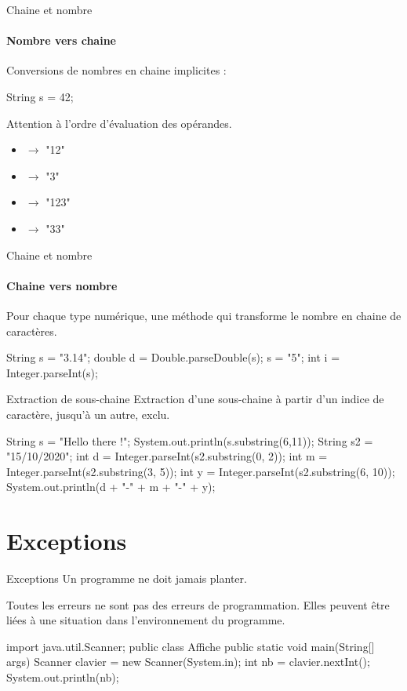 \begin{frame}[fragile]{Chaine et nombre}
  \framesubtitle{Nombre vers chaine}
  Conversions de nombres en chaine implicites :
  \begin{java}
String s = 42;
  \end{java}

  \pause Attention à l'ordre d'évaluation des opérandes.
  \begin{itemize}
    \item {} \pause \(\rightarrow\) "12"
    \pause
    \item {} \pause \(\rightarrow\) "3"
    \pause
    \item {} \pause\(\rightarrow\) "123"
    \pause
    \item {} \pause \(\rightarrow\) "33"
  \end{itemize}
\end{frame}

\begin{frame}[fragile]{Chaine et nombre}
  \framesubtitle{Chaine vers nombre}
  Pour chaque type numérique, une méthode qui transforme le nombre en chaine de
  caractères.
  \begin{java}
String s = "3.14";
double d = Double.parseDouble(s);
s = "5";
int i = Integer.parseInt(s);
  \end{java}
\end{frame}

\begin{frame}[fragile]{Extraction de sous-chaine}
  Extraction d'une sous-chaine à partir d'un indice de caractère, jusqu'à un
  autre, exclu.
  \begin{java}
String s = "Hello there !";
System.out.println(s.substring(6,11));
String s2 = "15/10/2020";
int d = Integer.parseInt(s2.substring(0, 2));
int m = Integer.parseInt(s2.substring(3, 5));
int y = Integer.parseInt(s2.substring(6, 10));
System.out.println(d + "-" + m + "-" + y);
  \end{java}
\end{frame}

\section{Exceptions}
\frame{\sectionpage}

\begin{frame}[fragile]{Exceptions}
  Un programme ne doit jamais planter.

  \pause
  Toutes les erreurs ne sont pas des erreurs de programmation. Elles peuvent
  être liées à une situation  dans l'environnement
  du programme.

\begin{java}
import java.util.Scanner;
public class Affiche {
    public static void main(String[] args) {
        Scanner clavier = new Scanner(System.in);
        int nb = clavier.nextInt();
        System.out.println(nb);
    }
}
\end{java}
\end{frame}

